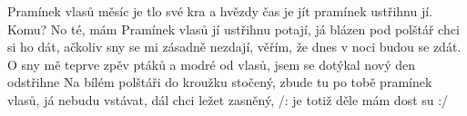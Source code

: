 \begin{TEXT}{Pramínek vlasů}
\SLOKA {} měsíc je tlo své  kra \NL
a hvězdy  čas je jít   \NL
pramínek  ustřihnu jí. \NL
Komu? No  té, mám   
\SLOKA Pramínek vlasů jí ustřihnu potají, \NL
já blázen pod polštář chci si ho dát, \NL
ačkoliv sny se mi zásadně nezdají, \NL
věřím, že dnes v noci budou se zdát. 
\SLOKA O sny mě  teprve  \NL
zpěv ptáků  a modré  \NL
od vlasů,  jsem se dotýkal  \NL
nový den  odstřihne  
\SLOKA Na bílém polštáři do kroužku stočený, \NL
zbude tu po tobě pramínek vlasů, \NL
já nebudu vstávat, dál chci ležet zasněný, \NL
/: je totiž děle  mám dost su :/ 
\end{TEXT}
